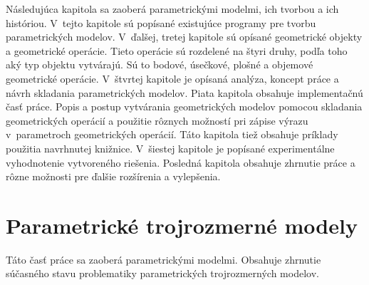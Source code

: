 

Následujúca kapitola sa zaoberá parametrickými modelmi, ich tvorbou a ich históriou.
V~tejto kapitole sú popísané existujúce programy pre tvorbu parametrických modelov.
V~ďalšej, tretej kapitole sú opísané geometrické objekty a geometrické operácie. Tieto operácie sú rozdelené na štyri druhy, podľa toho aký typ objektu vytvárajú. Sú to bodové, úsečkové, plošné a objemové geometrické operácie. 
V~štvrtej kapitole je opísaná analýza, koncept práce a návrh skladania parametrických modelov.
Piata kapitola obsahuje implementačnú časť práce. Popis a postup vytvárania geometrických modelov pomocou skladania geometrických operácií a použitie rôznych možností pri zápise výrazu v~parametroch geometrických operácií. Táto kapitola tiež obsahuje príklady použitia navrhnutej knižnice.
V~šiestej kapitole je popísané experimentálne vyhodnotenie vytvoreného riešenia.
Posledná kapitola obsahuje zhrnutie práce a rôzne možnosti pre ďalšie rozšírenia a vylepšenia.

\chapter{Parametrické trojrozmerné modely}
Táto časť práce sa zaoberá parametrickými modelmi. Obsahuje zhrnutie súčasného stavu problematiky parametrických trojrozmerných modelov.

